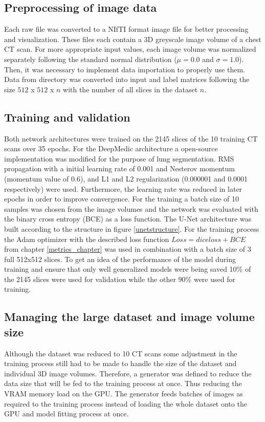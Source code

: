 \subsection{Preprocessing of image data}
Each raw file was converted to a NIfTI format image file for better processing and visualization. These files each contain a 3D greyscale image volume of a chest CT scan. For more appropriate input values, each image volume was normalized separately following the standard normal distribution ($\mu = 0.0$ and $\sigma = 1.0$).\newline
Then, it was necessary to implement data importation to properly use them. Data from directory was converted into input and label matrices following the size $512$ x $512$ x $n$ with the number of all slices in the dataset $n$.

\subsection{Training and validation}
Both network architectures were trained on the 2145 slices of the 10 training CT scans over 35 epochs.\newline
For the DeepMedic architecture a open-source implementation \cite{deepmedic} was modified for the purpose of lung segmentation. RMS propagation with a initial learning rate of 0.001 and Nesterov momentum (momentum value of 0.6), and L1 and L2 regularization (0.000001 and 0.0001 respectively) were used. Furthermore, the learning rate was reduced in later epochs in order to improve convergence. For the training a batch size of 10 samples was chosen from the image volumes and the network was evaluated with the binary cross entropy (BCE) as a loss function.\newline
The U-Net architecture was built according to the structure in figure \ref{unetstructure}. For the training process the Adam optimizer with the described loss function $Loss = dice loss + BCE$ from chapter \ref{metrics_chapter} was used in combination with a batch size of 3 full 512x512 slices. To get an idea of the performance of the model during training and ensure that only well generalized models were being saved 10\% of the 2145 slices were used for validation while the other 90\% were used for training.\newline

\subsection{Managing the large dataset and image volume size}
Although the dataset was reduced to 10 CT scans some adjustment in the training process still had to be made to handle the size of the dataset and individual 3D image volumes.\newline
Therefore, a generator was defined to reduce the data size that will be fed to the training process at once. Thus reducing the VRAM memory load on the GPU. The generator feeds batches of images as required to the training process instead of loading the whole dataset onto the GPU and model fitting process at once.

